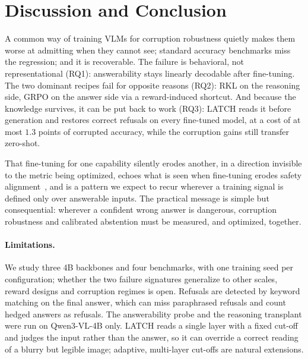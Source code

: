 \section{Discussion and Conclusion}
\label{sec:conclusion}

A common way of training VLMs for corruption robustness quietly makes them worse at
admitting when they cannot see; standard accuracy benchmarks miss the regression; and it
is recoverable. The failure is behavioral, not representational (RQ1): answerability
stays linearly decodable after fine-tuning. The two dominant recipes fail for opposite
reasons (RQ2): RKL on the reasoning side, GRPO on the answer side via a reward-induced
shortcut. And because the knowledge survives, it can be put back to work (RQ3): LATCH reads it
before generation and restores correct refusals on every fine-tuned model, at a cost of at
most $1.3$ points of corrupted accuracy, while the corruption gains still transfer
zero-shot.

That fine-tuning for one capability silently erodes another, in a direction invisible to
the metric being optimized, echoes what is seen when fine-tuning erodes safety
alignment~\cite{qi2024finetuning}, and is a pattern we expect to recur wherever a training
signal is defined only over answerable inputs. The practical message is simple but
consequential: wherever a confident wrong answer is dangerous, corruption robustness and
calibrated abstention must be measured, and optimized, together.

\paragraph{Limitations.}
We study three 4B backbones and four benchmarks, with one training seed per configuration;
whether the two failure signatures generalize to other scales, reward designs and
corruption regimes is open. Refusals are detected by keyword matching on the final answer,
which can miss paraphrased refusals and count hedged answers as refusals. The answerability
probe and the reasoning transplant were run on Qwen3-VL-4B only. LATCH reads a single
layer with a fixed cut-off and judges the input rather than the answer, so it can override
a correct reading of a blurry but legible image; adaptive, multi-layer cut-offs are natural
extensions.